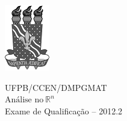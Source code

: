 \documentclass[11pt]{report}
\begin{document}
	\thispagestyle{empty}
	
	\noindent
	\begin{minipage}[c]{0.2\linewidth}
	\includegraphics{sm-ufpb-logo.png}
	\end{minipage} %
	\begin{minipage}[c]{0.7\linewidth}
		\begin{center}
			UFPB/CCEN/DMPGMAT \\
			$\mbox{Análise no} \ \mathbb{R}^{n}$ \\
			Exame de Qualificação -- 2012.2
		\end{center}
	\end{minipage}
	
	\vspace{0.8cm}
	
	
	
\end{document}
